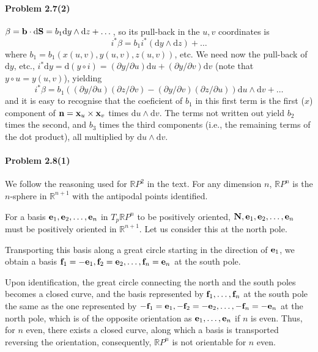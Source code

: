 \documentclass[a4paper,12pt]{article}
\def\d{\mathrm{d}}
\newcommand{\problem}[1]{\paragraph{Problem #1}}
\begin{document}

\problem{2.7(2)} $\beta = {\bf b}\cdot \d {\bf S} = b_1 \d y\wedge \d z + \dots$, so its pull-back in the $u, v$ coordinates is
\[
 i^* \beta = b_1 i^*(\d y\wedge \d z) + \dots
\]
where $b_1 = b_1(x(u,v), y(u,v), z(u,v))$, etc. We need now the pull-back of $\d y$, etc., $i^*\d y = \d (y\circ i) = (\partial y/\partial u)\d u + (\partial y/\partial v)\d v$ (note that $y\circ u = y(u,v)$), yielding
\[
 i^* \beta = b_1 \left((\partial y/\partial u)(\partial z/\partial v) - (\partial y/\partial v)(\partial z/\partial u)\right)\d u \wedge \d v + \dots
\]
and it is easy to recognise that the coeficient of $b_1$ in this first term is the first ($x$) component of ${\bf n} = {\bf x}_u \times {\bf x}_v$ times $\d u\wedge \d v$. The terms not written out yield $b_2$ times the second, and $b_3$ times the third components (i.e., the remaining terms of the dot product), all multiplied by $\d u \wedge \d v$.


\problem{2.8(1)} We follow the reasoning used for $\mathbb{R}P^2$ in the text. For any dimension $n$, $\mathbb{R}P^n$ is the $n$-sphere in $\mathbb{R}^{n+1}$ with the antipodal points identified.

For a basis ${\bf e}_1, {\bf e}_2, \dots, {\bf e}_n$ in $T_p \mathbb{R}P^n$ to be positively oriented, ${\bf N}, {\bf e}_1, {\bf e}_2, \dots, {\bf e}_n$ must be positively oriented in $\mathbb{R}^{n+1}$. Let us consider this at the north pole.

Transporting this basis along a great circle starting in the direction of ${\bf e}_1$, we obtain a basis ${\bf f}_1=-{\bf e}_1, {\bf f}_2={\bf e}_2, \dots, {\bf f}_n = {\bf e}_n$ at the south pole.

Upon identification, the great circle connecting the north and the south poles becomes a closed curve, and the basis represented by ${\bf f}_1, \dots, {\bf f}_n$ at the south pole the same as the one represented by $-{\bf f}_1={\bf e}_1, -{\bf f}_2 = -{\bf e}_2, \dots, -{\bf f}_n = -{\bf e}_n$ at the north pole, which is of the opposite orientation as ${\bf e}_1, \dots, {\bf e}_n$ if $n$ is even. Thus, for $n$ even, there exists a closed curve, along which a basis is transported reversing the orientation, consequently, $\mathbb{R}P^n$ is not orientable for $n$ even.

\end{document}
